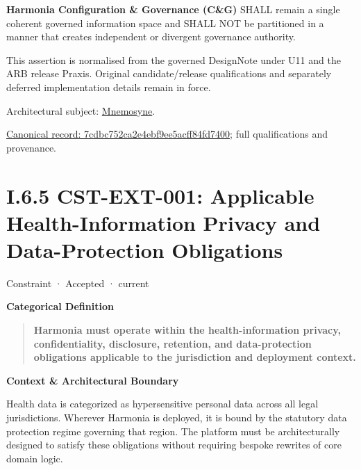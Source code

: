 \textbf{Harmonia Configuration \& Governance (C\&G)} SHALL remain a single coherent governed information space and SHALL NOT be partitioned in a manner that creates independent or divergent governance authority.



This assertion is normalised from the governed DesignNote under U11 and the ARB release Praxis. Original candidate/release qualifications and separately deferred implementation details remain in force.



Architectural subject: \hyperref[element:7985e647bf9e4ca3ba70faf9e3e4ae02]{Mnemosyne}.


{\footnotesize \href{../../../../../../../continuum/motivation/constraint/7cdbc752ca2e4ebf9ee5acff84fd7400.md}{Canonical record: 7cdbc752ca2e4ebf9ee5acff84fd7400}; full qualifications and provenance.}\par
\section*{I.6.5 CST-EXT-001: Applicable Health-Information Privacy and Data-Protection Obligations}
\label{navigation:I.6.5}

\label{element:0ed6fb9fcc9547659ce76b917881274e}
{\small Constraint · Accepted · current}\par

\par\medskip\textbf{Categorical Definition}\par


\begin{quote}


\textbf{Harmonia must operate within the health-information privacy, confidentiality, disclosure, retention, and data-protection obligations applicable to the jurisdiction and deployment context.}



\end{quote}


\par\medskip\textbf{Context \& Architectural Boundary}\par


Health data is categorized as hypersensitive personal data across all legal jurisdictions. Wherever Harmonia is deployed, it is bound by the statutory data protection regime governing that region. The platform must be architecturally designed to satisfy these obligations without requiring bespoke rewrites of core domain logic.



